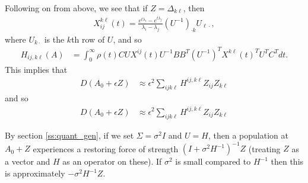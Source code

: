 \documentclass[9 pt]{article}
\newcommand{\1}{\mathbbm{1}}
\begin{document}
Following on from above, we see that if $Z=\Delta_{k \ell}$, then
\begin{equation}
  \begin{aligned}
      X_{ij}^{k\ell}(t) = 
      \frac{ e^{t \lambda_i} - e^{t \lambda_j} }{ \lambda_i - \lambda_j } 
      (U^{-1})_{\cdot k} U_{\ell \cdot},
  \end{aligned}
\end{equation}
where $U_{k \cdot}$ is the $k$th row of $U$,
and so
\begin{equation}
    \begin{aligned}
        H_{ij, k\ell}(A)
        &=
        \int_0^\infty
            \rho(t) C U X^{ij}(t) U^{-1} B B^T (U^{-1})^T X^{k\ell}(t)^T U^T C^T
        dt .
    \end{aligned}
\end{equation}
This implies that
\begin{equation}
    \begin{aligned}
        D(A_0+\epsilon Z)
        &\approx \epsilon^2\sum_{ijk\ell} H^{ij,k\ell} Z_{ij} Z_{k\ell} 
    \end{aligned}
\end{equation}
and so
\begin{equation}
    \begin{aligned}
        D(A_0+\epsilon Z)
        &\approx \epsilon^2\sum_{ijk\ell} H^{ij,k\ell} Z_{ij} Z_{k\ell} 
    \end{aligned}
\end{equation}

By section \ref{ss:quant_gen},
if we set $\Sigma=\sigma^2 I$ and $U=H$,
then a population at $A_0+Z$ experiences a restoring force of strength
$(I + \sigma^2 H^{-1})^{-1} Z$ (treating $Z$ as a vector and $H$ as an operator on these).
If $\sigma^2$ is small compared to $H^{-1}$
then this is approximately $-\sigma^2 H^{-1} Z$.
\end{document}
